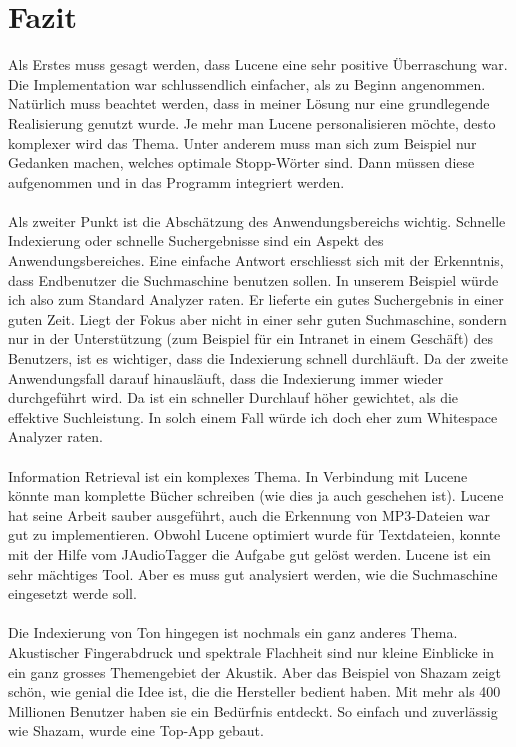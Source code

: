 \documentclass[12pt,a4paper,ngerman]{report}
\begin{document}
\chapter{Fazit}
Als Erstes muss gesagt werden, dass Lucene eine sehr positive Überraschung war. Die Implementation war schlussendlich einfacher, als zu Beginn angenommen. Natürlich muss beachtet werden, dass in meiner Lösung nur eine grundlegende Realisierung genutzt wurde. Je mehr man Lucene personalisieren möchte, desto komplexer wird das Thema. Unter anderem muss man sich zum Beispiel nur Gedanken machen, welches optimale Stopp-Wörter sind. Dann müssen diese aufgenommen und in das Programm integriert werden.\\
\\
Als zweiter Punkt ist die Abschätzung des Anwendungsbereichs wichtig. Schnelle Indexierung oder schnelle Suchergebnisse sind ein Aspekt des Anwendungsbereiches. Eine einfache Antwort erschliesst sich mit der Erkenntnis, dass Endbenutzer die Suchmaschine benutzen sollen. In unserem Beispiel würde ich also zum Standard Analyzer raten. Er lieferte ein gutes Suchergebnis in einer guten Zeit. Liegt der Fokus aber nicht in einer sehr guten Suchmaschine, sondern nur in der Unterstützung (zum Beispiel für ein Intranet in einem Geschäft) des Benutzers, ist es wichtiger, dass die Indexierung schnell durchläuft. Da der zweite Anwendungsfall darauf hinausläuft, dass die Indexierung immer wieder durchgeführt wird. Da ist ein schneller Durchlauf höher gewichtet, als die effektive Suchleistung. In solch einem Fall würde ich doch eher zum Whitespace Analyzer raten.\\
\\
Information Retrieval ist ein komplexes Thema. In Verbindung mit Lucene könnte man komplette Bücher schreiben (wie dies ja auch geschehen ist). Lucene hat seine Arbeit sauber ausgeführt, auch die Erkennung von MP3-Dateien war gut zu implementieren. Obwohl Lucene optimiert wurde für Textdateien, konnte mit der Hilfe vom JAudioTagger die Aufgabe gut gelöst werden. Lucene ist ein sehr mächtiges Tool. Aber es muss gut analysiert werden, wie die Suchmaschine eingesetzt werde soll.\\
\\
Die Indexierung von Ton hingegen ist nochmals ein ganz anderes Thema. Akustischer Fingerabdruck und spektrale Flachheit sind nur kleine Einblicke in ein ganz grosses Themengebiet der Akustik. Aber das Beispiel von Shazam zeigt schön, wie genial die Idee ist, die die Hersteller bedient haben. Mit mehr als 400 Millionen Benutzer haben sie ein Bedürfnis entdeckt. So einfach und zuverlässig wie Shazam, wurde eine Top-App gebaut.
\end{document}
